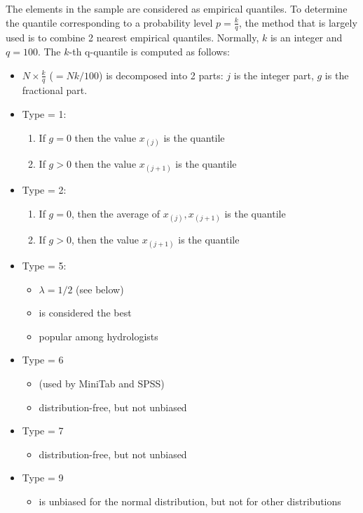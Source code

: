 The elements in the sample are considered as empirical quantiles. To
determine the quantile corresponding to a probability level $p =
\frac{k}{q}$, the method that is largely used is to combine 2 nearest
empirical quantiles. Normally, $k$ is an integer and $q=100$. The
$k$-th q-quantile is computed as follows:
\begin{itemize}
\item $N\times \frac{k}{q}$ ($=Nk/100$) is decomposed into 2 parts:
  $j$ is the integer part, $g$ is the fractional part.
\item Type = 1:
  \begin{enumerate}
    \item If $g=0$ then the value $x_{(j)}$ is the quantile
    \item If $g>0$ then the value $x_{(j+1)}$ is the quantile
  \end{enumerate}
\item Type = 2:
  \begin{enumerate}
  \item If $g=0$, then the average of  $x_{(j)}, x_{(j+1)}$ is the
    quantile
  \item If $g>0$, then the value $x_{(j+1)}$ is the quantile
  \end{enumerate}
\item Type = 5:
  \begin{itemize}
    \item $\lambda = 1/2$ (see below)
    \item is considered the best
    \item popular among hydrologists
  \end{itemize}

\item Type = 6 
  \begin{itemize}
    \item (used by MiniTab and SPSS)  
    \item distribution-free,  but not unbiased

  \end{itemize}
\item Type = 7
  \begin{itemize}
  \item distribution-free, but not unbiased
  \end{itemize}
\item Type = 9 
  \begin{itemize}
  \item is unbiased for the normal distribution, but not for
  other distributions
  \end{itemize}
\end{itemize}




